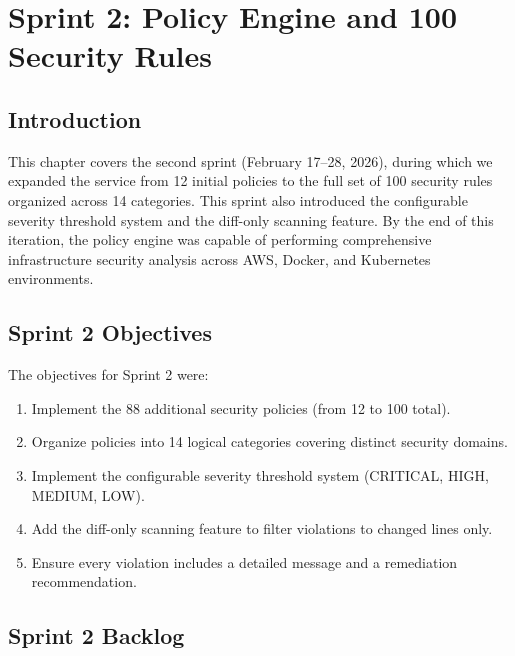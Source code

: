 
\chapter{Sprint 2: Policy Engine and 100 Security Rules}

\section{Introduction}

This chapter covers the second sprint (February 17--28, 2026), during which we expanded the service from 12 initial policies to the full set of 100 security rules organized across 14 categories. This sprint also introduced the configurable severity threshold system and the diff-only scanning feature. By the end of this iteration, the policy engine was capable of performing comprehensive infrastructure security analysis across AWS, Docker, and Kubernetes environments.

\section{Sprint 2 Objectives}

The objectives for Sprint 2 were:

\begin{enumerate}
    \item Implement the 88 additional security policies (from 12 to 100 total).
    \item Organize policies into 14 logical categories covering distinct security domains.
    \item Implement the configurable severity threshold system (CRITICAL, HIGH, MEDIUM, LOW).
    \item Add the diff-only scanning feature to filter violations to changed lines only.
    \item Ensure every violation includes a detailed message and a remediation recommendation.
\end{enumerate}

\section{Sprint 2 Backlog}

